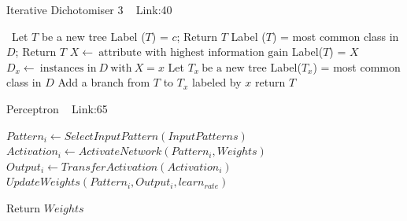 \documentclass[a4paper]{article}
\begin{document}
  \begin{algorithm}
   \caption{Iterative Dichotomiser 3 ~\cite{id3algo1} Link:{40}}
    \begin{algorithmic}[1]
      \
      \State Let $T$ be a new tree 
      \State Label ($T$) = $c$; Return $T$
      \EndIf
      \State Label ($T$) = most common class in $D$; Return $T$
      \EndIf
      \State $X \leftarrow \ \text{attribute with highest information gain} $
      \State Label($T$) = $X$
            \State $D_x \leftarrow \ \text{instances in} \ D \ \text{with} \ X = x $
           \If {$D_x \ \text{is empty}$}
           \State Let $T_x \ \text{be a new tree}$
           \State Label($T_x$) = most common class in $D$
           \EndIf
            \State Add a branch from $T$ to $T_x$ labeled by $x$
        \EndFor
        \State return $T$
         



 \EndFunction

 
\end{algorithmic}
\end{algorithm}


  \begin{algorithm}
   \caption{Perceptron ~\cite{perceptron1} Link:{65}}
    \begin{algorithmic}[1]
     \OUTPUT{$Weights$}
    
            \State $Pattern_i \leftarrow SelectInputPattern(InputPatterns)$
            \State $Activation_i \leftarrow ActivateNetwork(Pattern_i,Weights)$
            \State $Output_i \leftarrow TransferActivation(Activation_i)$
            \State $UpdateWeights(Pattern_i,Output_i,learn_{rate})$
        \EndFor
        
       
       \State Return $Weights$



 

\end{algorithmic}
\end{algorithm}
\end{document}
